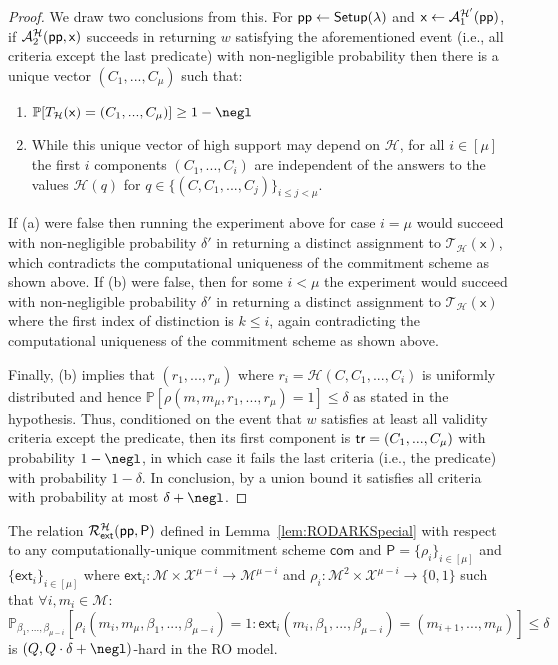 \begin{proof}
We draw two conclusions from this. For $\textsf{pp} \gets \textsf{{Setup}}(\lambda)$ and $\mathsf{x} \gets \mathcal{A}_1^{\mathcal{H}'}(\textsf{pp})$, if $\mathcal{A}_2^\mathcal{H}(\textsf{pp}, \mathsf{x})$ succeeds in returning $w$ satisfying the aforementioned event (i.e., all criteria except the last predicate) with non-negligible probability then there is a unique vector $(C_1,...,C_\mu)$ such that: 
\begin{enumerate}[label=(\alph*)]
	\item $\mathbb{P}[T_{\mathcal{H}}(\mathsf{x}) = (C_1,...,C_\mu)] \geq 1 - \negl$
	\item While this unique vector of high support may depend on $\mathcal{H}$, for all $i \in [\mu]$ the first $i$ components $(C_1,...,C_i)$ are independent of the answers to the values $\mathcal{H}(q)$ for $q \in \{(C, C_1,...,C_j)\}_{i \leq j < \mu}$. 
\end{enumerate}
 If (a) were false then running the experiment above for case $i = \mu$ would succeed with non-negligible probability $\delta'$ in returning a distinct assignment to $\mathcal{T}_\mathcal{H}(\mathsf{x})$, which contradicts the computational uniqueness of the commitment scheme as shown above. If (b) were false, then for some $i < \mu$ the experiment would succeed with non-negligible probability $\delta'$ in returning a distinct assignment to $\mathcal{T}_\mathcal{H}(\mathsf{x})$ where the first index of distinction is $k \leq i$, again contradicting the computational uniqueness of the commitment scheme as shown above. 
 
 Finally, (b) implies that $(r_1,...,r_\mu)$ where $r_i = \mathcal{H}(C,C_1,...,C_i)$ is uniformly distributed and hence $\mathbb{P}[\rho(m,m_\mu,r_1,...,r_\mu) = 1] \leq \delta$ as stated in the hypothesis. Thus, conditioned on the event that $w$ satisfies at least all validity criteria except the predicate, then its first component is $\textsf{{tr}} = (C_1,...,C_\mu)$ with probability $1-\negl$, in which case it fails the last criteria (i.e., the predicate) with probability $1-\delta$. In conclusion, by a union bound it satisfies all criteria with probability at most $\delta + \negl$. \end{proof}


\begin{lemma} 
The relation $\mathcal{R}^{\mathcal{H}}_\textsf{ext}(\textsf{pp}, \textsf{P})$ defined in Lemma~\ref{lem:RODARKSpecial} with respect to any computationally-unique commitment scheme $\mathsf{com}$ and $\textsf{P} = \{\rho_i\}_{i \in [\mu]}$ and $\{ \textsf{ext}_i\}_{i \in [\mu]}$ where $\textsf{ext}_i: \mathcal{M} \times \mathcal{X}^{\mu - i} \rightarrow \mathcal{M}^{\mu - i}$ and $\rho_i: \mathcal{M}^2 \times \mathcal{X}^{\mu - i} \rightarrow \{0,1\}$ such that $\forall i, m_i \in \mathcal{M}$: 
$$\mathbb{P}_{\beta_1,...,\beta_{\mu - i}}[\rho_i(m_i, m_\mu, \beta_1,...,\beta_{\mu - i}) = 1: \textsf{ext}_i(m_i, \beta_1,...,\beta_{\mu - i}) = (m_{i+1},...,m_\mu)] \leq \delta $$
is $(Q, Q \cdot \delta + \negl)$-hard in the RO model. 
\end{lemma}
\fi 

